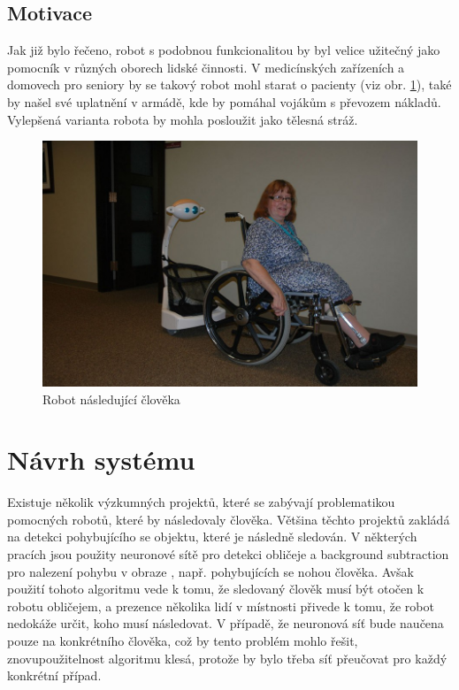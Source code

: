 \documentclass[twoside]{ctuthesis}
\theoremstyle{plain}
\theoremstyle{definition}
\theoremstyle{note}
\begin{document}
\section{Motivace}

Jak již bylo řečeno, robot s podobnou funkcionalitou by byl velice užitečný jako pomocník v různých oborech lidské činnosti. V medicínských zařízeních a domovech pro seniory by se takový robot mohl starat o pacienty (viz obr. \ref{rnc}), také by našel své uplatnění v armádě, kde by pomáhal vojákům s převozem nákladů. Vylepšená varianta robota by mohla posloužit jako tělesná stráž.


\begin{figure}
	\caption{Robot následující člověka}

	\label{rnc}
	\includegraphics[width=\textwidth]{images/0/maxresdefault.jpg}
\end{figure}



\chapter{Návrh systému}

Existuje několik výzkumných projektů, které se zabývají problematikou pomocných robotů, které by následovaly člověka. Většina těchto projektů zakládá na detekci pohybujícího se objektu, které je následně sledován. V některých pracích jsou použity neuronové sítě pro detekci obličeje a background subtraction pro nalezení pohybu v obraze \cite{cite:19}, např. pohybujících se nohou člověka. Avšak použití tohoto algoritmu vede k tomu, že sledovaný člověk musí být otočen k robotu obličejem, a prezence několika lidí v místnosti přivede k tomu, že robot nedokáže určit, koho musí následovat. V případě, že neuronová síť bude naučena pouze na konkrétního člověka, což by tento problém mohlo řešit, znovupoužitelnost algoritmu klesá, protože by bylo třeba síť přeučovat pro každý konkrétní případ.
\end{document}
